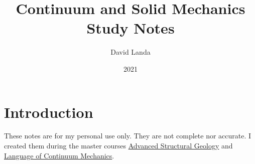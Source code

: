 \documentclass{report}
\title  {Continuum and Solid Mechanics \\ Study Notes}
\author {David Landa}
\date   {2021}
\begin{document}
\maketitle
\tableofcontents

\chapter{Introduction}

These notes are for my personal use only. They are not complete nor accurate. I created them during the master courses  \href{https://is.cuni.cz/studium/eng/predmety/index.php?do=predmet&kod=MG440P46}{Advanced Structural Geology} and \href{https://is.cuni.cz/studium/predmety/index.php?id=15376e056557fd1aa0462c0718f16ca7&tid=&do=predmet&kod=MG451P11&skr=2020}{Language of Continuum Mechanics}. 

% 
% 
% 
\end{document}
